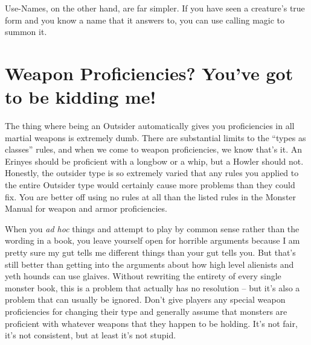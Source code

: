 Use-Names, on the other hand, are far simpler. If you have seen a creature's true form and you know a name that it answers to, you can use calling magic to summon it.

\section{Weapon Proficiencies? You've got to be kidding me!}
The thing where being an Outsider automatically gives you proficiencies in all martial weapons is extremely dumb. There are substantial limits to the ``types as classes'' rules, and when we come to weapon proficiencies, we know that's it. An Erinyes should be proficient with a longbow or a whip, but a Howler should not. Honestly, the outsider type is so extremely varied that any rules you applied to the entire Outsider type would certainly cause more problems than they could fix. You are better off using no rules at all than the listed rules in the Monster Manual for weapon and armor proficiencies.

When you \emph{ad hoc} things and attempt to play by common sense rather than the wording in a book, you leave yourself open for horrible arguments because I am pretty sure my gut tells me different things than your gut tells you. But that's still better than getting into the arguments about how high level alienists and yeth hounds can use glaives. Without rewriting the entirety of every single monster book, this is a problem that actually has no resolution -- but it's also a problem that can usually be ignored. Don't give players any special weapon proficiencies for changing their type and generally assume that monsters are proficient with whatever weapons that they happen to be holding. It's not fair, it's not consistent, but at least it's not stupid.
